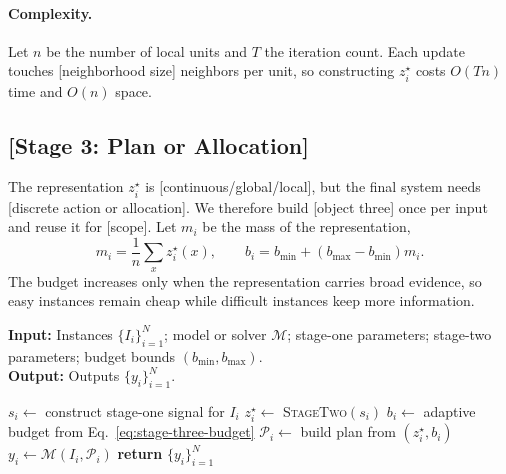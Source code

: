 \paragraph{Complexity.}
Let $n$ be the number of local units and $T$ the iteration count. Each update touches [neighborhood size] neighbors per unit, so constructing $z_i^{\star}$ costs $O(Tn)$ time and $O(n)$ space.

\subsection{[Stage 3: Plan or Allocation]}\label{sec:stage-three}

The representation $z_i^{\star}$ is [continuous/global/local], but the final system needs [discrete action or allocation]. We therefore build [object three] once per input and reuse it for [scope]. Let $m_i$ be the mass of the representation,
\begin{equation}\label{eq:stage-three-budget}
    m_i=\frac{1}{n}\sum_x z_i^{\star}(x),
    \qquad
    b_i=b_{\min}+(b_{\max}-b_{\min})m_i.
\end{equation}
The budget increases only when the representation carries broad evidence, so easy instances remain cheap while difficult instances keep more information.

\begin{algorithm}[tb]
\small
\caption{End-to-End [Method Name] Pipeline}
\label{alg:e2e}
\begin{flushleft}
\hspace*{0.02in} \textbf{Input:}
Instances $\{I_i\}_{i=1}^{N}$;
model or solver $\mathcal{M}$;
stage-one parameters;
stage-two parameters;
budget bounds $(b_{\min}, b_{\max})$.\\
\hspace*{0.02in} \textbf{Output:}
Outputs $\{y_i\}_{i=1}^{N}$.
\end{flushleft}
\begin{algorithmic}[1]
        \State $s_i \gets$ construct stage-one signal for $I_i$
        \State $z_i^{\star} \gets$ \textsc{StageTwo}$(s_i)$
        \State $b_i \gets$ adaptive budget from Eq.~\ref{eq:stage-three-budget}
        \State $\mathcal{P}_i \gets$ build plan from $(z_i^{\star}, b_i)$
        \State $y_i \gets \mathcal{M}(I_i, \mathcal{P}_i)$
    \EndFor
    \State \textbf{return} $\{y_i\}_{i=1}^{N}$
\end{algorithmic}
\end{algorithm}

